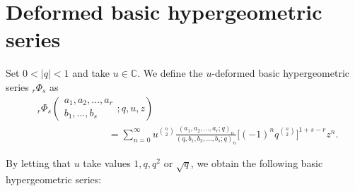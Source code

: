 \documentclass{cimart}
\newcommand{\C}{\mathbb{C}}
\begin{document}
\section{Deformed basic hypergeometric series}

\begin{definition}
Set $0<\vert q\vert<1$ and take $u\in\C$. We define the $u$-deformed basic hypergeometric series ${}_{r}\Phi_{s}$ as
    \begin{align}
        &{}_{r}\Phi_{s}\left(
    \begin{array}{c}
         a_{1},a_{2},\ldots,a_{r} \\
         b_{1},\ldots,b_{s}
    \end{array}
    ;q,u,z
    \right)\nonumber\\
    &\hspace{3cm}=\sum_{n=0}^{\infty}u^{\binom{n}{2}}\frac{(a_{1},a_{2},\ldots,a_{r};q)_{n}}{(q,b_{1},b_{2},\ldots,b_{s};q)_{n}}\bigg[(-1)^nq^{\binom{n}{2}}\bigg]^{1+s-r}z^n.                
    \end{align}
\end{definition}
By letting that $u$ take values $1, q, q^2$ or $\sqrt{q}$, we obtain the following basic hypergeometric series:
\end{document}
